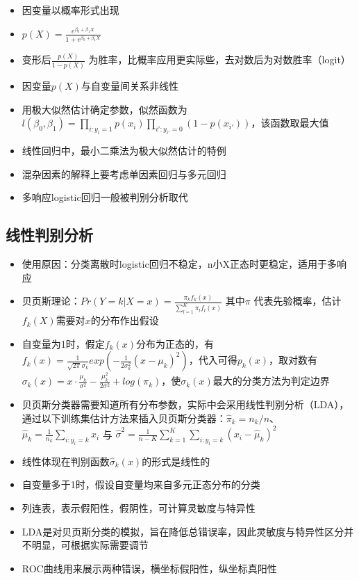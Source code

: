 \documentclass[]{book}
\providecommand{\tightlist}{%
  \setlength{\itemsep}{0pt}\setlength{\parskip}{0pt}}
\begin{document}
\begin{itemize}
\tightlist
\item
  因变量以概率形式出现
\item
  \(p(X) = \frac {e^{\beta_0 + \beta_1 X}}{1 + e^{\beta_0 + \beta_1 X}}\)
\item
  变形后\(\frac {p(X)}{1 - p(X)}\) 为胜率，比概率应用更实际些，去对数后为对数胜率（logit）
\item
  因变量\(p(X)\)与自变量间关系非线性
\item
  用极大似然估计确定参数，似然函数为\(l(\beta_0, \beta_1) = \prod_{i:y_i = 1} p(x_i)\prod_{i':y_{i'} = 0} (1 - p(x_{i'}))\)，该函数取最大值
\item
  线性回归中，最小二乘法为极大似然估计的特例
\item
  混杂因素的解释上要考虑单因素回归与多元回归
\item
  多响应logistic回归一般被判别分析取代
\end{itemize}

\subsection{线性判别分析}

\begin{itemize}
\tightlist
\item
  使用原因：分类离散时logistic回归不稳定，n小X正态时更稳定，适用于多响应
\item
  贝页斯理论：\(Pr(Y = k|X = x) = \frac{\pi_k f_k(x)}{\sum_{l = 1}^K \pi_lf_l(x)}\) 其中\(\pi\) 代表先验概率，估计\(f_k(X)\)需要对\(x\)的分布作出假设
\item
  自变量为1时，假定\(f_k(x)\)分布为正态的，有\(f_k(x) = \frac{1}{\sqrt{2 \pi} \sigma_k} exp(- \frac{1}{2 \sigma_k^2} (x - \mu_k)^2)\)，代入可得\(p_k(x)\)，取对数有\(\sigma_k(x) = x \cdot \frac{\mu_k}{\sigma^2} - \frac{\mu_k^2}{2\sigma^2} + log(\pi_k)\)，使\(\sigma_k(x)\)最大的分类方法为判定边界
\item
  贝页斯分类器需要知道所有分布参数，实际中会采用线性判别分析（LDA），通过以下训练集估计方法来插入贝页斯分类器：\(\hat \pi_k = n_k/n\)、\(\hat \mu_k = \frac{1}{n_k} \sum_{i:y_i = k} x_i\) 与 \(\hat \sigma^2 = \frac{1}{n - K} \sum_{k = 1}^K \sum_{i:y_i = k} (x_i - \hat \mu_k)^2\)
\item
  线性体现在判别函数\(\hat \sigma_k(x)\)的形式是线性的
\item
  自变量多于1时，假设自变量均来自多元正态分布的分类
\item
  列连表，表示假阳性，假阴性，可计算灵敏度与特异性
\item
  LDA是对贝页斯分类的模拟，旨在降低总错误率，因此灵敏度与特异性区分并不明显，可根据实际需要调节
\item
  ROC曲线用来展示两种错误，横坐标假阳性，纵坐标真阳性
\end{itemize}
\end{document}

